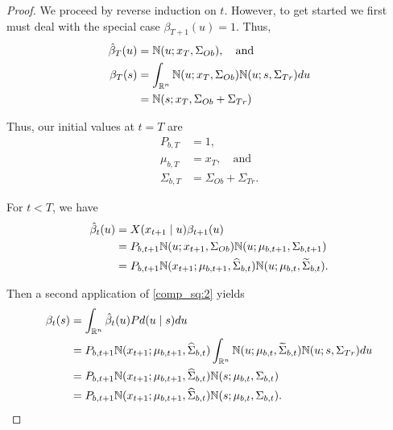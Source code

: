 \documentclass[12pt,leqno]{article}
\begin{document}
\begin{proof}
  We proceed by reverse induction on $t$. However, to get started we first must  deal with
  the special case $\beta_{T+1}(u) = 1$.  Thus,
  \begin{align*}
    \hat{\beta}_T(u) &= {\mathbb N}(u;x_T,\Sigma_{Ob}),\quad\text{and}\\
    \beta_T(s) &= \int_{{\mathbb R}^n}{\mathbb N}(u;x_T,\Sigma_{Ob}){\mathbb N}(u;s,\Sigma_{Tr})du \\
    &= {\mathbb N}(s;x_T,\Sigma_{Ob}+\Sigma_{Tr})
  \end{align*}

  Thus, our initial values at $t = T$ are
  \begin{align*}
  P_{b,T} &= 1,\\
  \mu_{b,T} &= x_T, \quad\text{and}\\
  \Sigma_{b,T} &= \Sigma_{Ob}+\Sigma_{Tr}.
  \end{align*}

  For $t <  T$, we have 
  \begin{align*}
    \hat{\beta}_t(u) &= X(x_{t+1}\mid u)\beta_{t+1}(u)\\
    &= P_{b,t+1}{\mathbb N}(u;x_{t+1},\Sigma_{Ob}){\mathbb N}(u;\mu_{b,t+1},\Sigma_{b,t+1})\\
    &= P_{b,t+1}{\mathbb N}(x_{t+1};\mu_{b,t+1},\widehat{\Sigma}_{b,t}){\mathbb N}(u;\mu_{b,t},\widetilde{\Sigma}_{b,t}).
  \end{align*}

  Then a second application of \eqref{comp_sq:2} yields
  \begin{align*}
    \beta_t(s) &= \int_{{\mathbb R}^n}\hat{\beta}_t(u)Pd(u\mid s)du \\
    &= P_{b,t+1}{\mathbb N}(x_{t+1};\mu_{b,t+1},\widehat{\Sigma}_{b,t})\int_{{\mathbb R}^n}{\mathbb N}(u;\mu_{b,t},\widetilde{\Sigma}_{b,t}){\mathbb N}(u;s,\Sigma_{Tr})du\\
    &=P_{b,t+1}{\mathbb N}(x_{t+1};\mu_{b,t+1},\widehat{\Sigma}_{b,t}){\mathbb N}(s;\mu_{b,t},\Sigma_{b,t})\\
    &= P_{b,t+1}{\mathbb N}(x_{t+1};\mu_{b,t+1},\widehat{\Sigma}_{b,t}){\mathbb N}(s;\mu_{b,t},\Sigma_{b,t}).
  \end{align*}
\end{proof}
\end{document}
